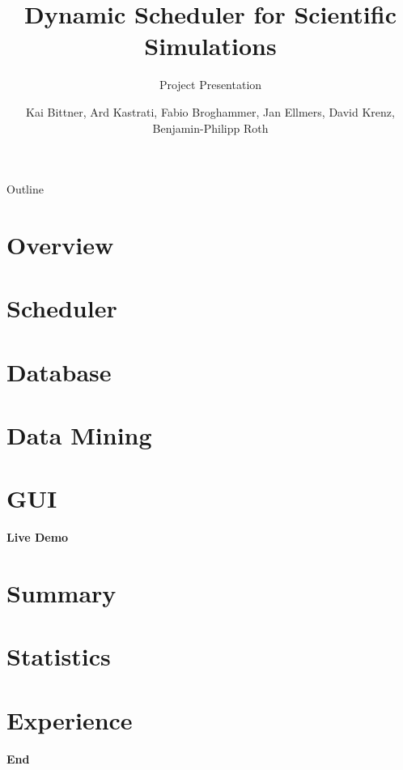\documentclass[18pt,handout]{beamer}
\title[Project Presentation]{Dynamic Scheduler for Scientific Simulations}
\subtitle{Project Presentation}
\author{Kai Bittner, Ard Kastrati, Fabio Broghammer, Jan Ellmers, David Krenz, Benjamin-Philipp Roth}
\institute{Steinbuch Centre for Computing - SCC}
\begin{document}

\begin{frame}
\titlepage
\end{frame}




\begin{frame}{Outline}
\tableofcontents
\end{frame}

\section{Overview}

\section{Scheduler}

\section{Database}



\section{Data Mining}


\section{GUI}


\begin{frame}
	\begin{center}
			\huge{\textbf{Live Demo}}
	\end{center}		
\end{frame}

\section{Summary}

\section{Statistics}

\section{Experience}

\begin{frame}
	\begin{center}
			\huge{\textbf{End}}
	\end{center}		
\end{frame}
\end{document}
